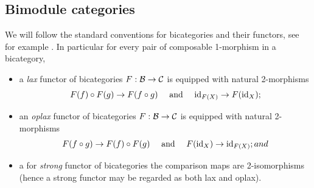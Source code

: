\documentclass{amsart}
\begin{document}
%
%



\subsection{Bimodule categories} \label{sec:tc-bimod}
We will follow the standard conventions for bicategories and their functors, see for example \cite{MR2664622}. In particular for every pair of composable 1-morphism in a bicategory, 
\begin{itemize}
	\item a {\em lax} functor of bicategories $F: \mathcal B \to \mathcal C$ is equipped with natural 2-morphisms
	\begin{equation*}
		F(f) \circ F(g) \to F(f \circ g) \quad \textrm{ and } \quad \mathrm{id}_{F(X)} \to F(\mathrm{id}_X);
	\end{equation*} 
	\item an {\em oplax} functor of bicategories $F: \mathcal B \to \mathcal C$ is equipped with natural 2-morphisms
	\begin{equation*}
		F(f \circ g) \to F(f) \circ F(g)   \quad \textrm{ and } \quad F(\mathrm{id}_X) \to \mathrm{id}_{F(X)}; and
	\end{equation*}
	\item a for {\em strong} functor of bicategories the comparison maps are 2-isomorphisms (hence a strong functor may be regarded as both lax and oplax). 
\end{itemize}
\end{document}
